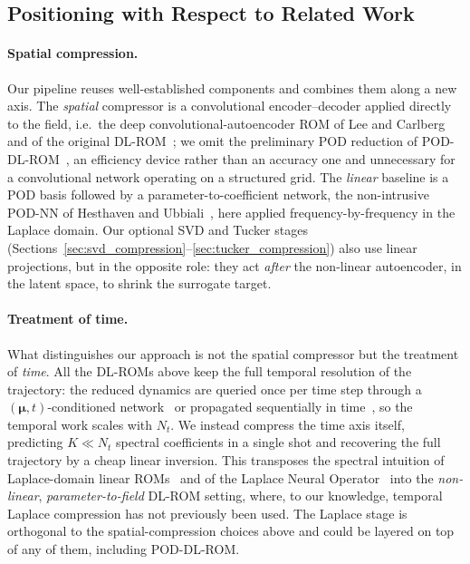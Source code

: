 ﻿\documentclass[a4paper,12pt]{article}
\theoremstyle{definition}
\theoremstyle{remark}
\newcommand{\vmu}{\bm{\mu}}
\begin{document}
\subsection{Positioning with Respect to Related Work}
\label{sec:positioning}

\paragraph{Spatial compression.}
Our pipeline reuses well-established components and combines them along a new axis. The \emph{spatial} compressor is a convolutional encoder--decoder applied directly to the field, i.e.\ the deep convolutional-autoencoder ROM of Lee and Carlberg~\cite{lee2020} and of the original DL-ROM~\cite{fresca2021}; we omit the preliminary POD reduction of POD-DL-ROM~\cite{fresca2022}, an efficiency device rather than an accuracy one and unnecessary for a convolutional network operating on a structured grid. The \emph{linear} baseline is a POD basis followed by a parameter-to-coefficient network, the non-intrusive POD-NN of Hesthaven and Ubbiali~\cite{hesthaven2018}, here applied frequency-by-frequency in the Laplace domain. Our optional SVD and Tucker stages (Sections~\ref{sec:svd_compression}--\ref{sec:tucker_compression}) also use linear projections, but in the opposite role: they act \emph{after} the non-linear autoencoder, in the latent space, to shrink the surrogate target.

\paragraph{Treatment of time.}
What distinguishes our approach is not the spatial compressor but the treatment of \emph{time}. All the DL-ROMs above keep the full temporal resolution of the trajectory: the reduced dynamics are queried once per time step through a $(\vmu, t)$-conditioned network~\cite{fresca2021,fresca2022} or propagated sequentially in time~\cite{pant2021deep}, so the temporal work scales with $N_t$. We instead compress the time axis itself, predicting $K \ll N_t$ spectral coefficients in a single shot and recovering the full trajectory by a cheap linear inversion. This transposes the spectral intuition of Laplace-domain linear ROMs~\cite{reyes2025,guglielmi2023} and of the Laplace Neural Operator~\cite{cao2023} into the \emph{non-linear}, \emph{parameter-to-field} DL-ROM setting, where, to our knowledge, temporal Laplace compression has not previously been used. The Laplace stage is orthogonal to the spatial-compression choices above and could be layered on top of any of them, including POD-DL-ROM.
\end{document}
